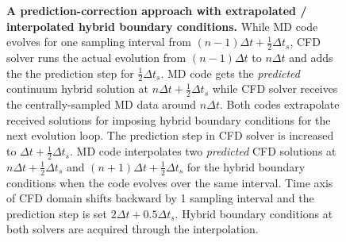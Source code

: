 \documentclass[preprint,12pt]{elsarticle}
\begin{document}
\begin{figure}
\centering
{}
\caption[]{\small {\bf A prediction-correction approach with extrapolated / interpolated hybrid boundary conditions.} 
 While MD code evolves for one sampling interval from
$(n-1){\Delta}t + \frac{1}{2}{\Delta}{t_s}$, CFD solver runs the actual evolution
from $(n-1){\Delta}t$ to $n{\Delta}t$ and adds the the prediction step
for $\frac{1}{2}{\Delta}{t_s}$. MD code gets the \textit{predicted} continuum hybrid solution
at $n{\Delta}t + \frac{1}{2}{\Delta}{t_s}$ while CFD solver receives the
centrally-sampled MD data around $n{\Delta}t$. Both codes extrapolate received solutions
for imposing hybrid boundary conditions for the next evolution loop.
 The prediction step in CFD solver is increased to
${\Delta}t + \frac{1}{2}{\Delta}{t_s}$. MD code interpolates two \textit{predicted}
CFD solutions at $n{\Delta}t + \frac{1}{2}{\Delta}{t_s}$ and
$(n+1){\Delta}t + \frac{1}{2}{\Delta}{t_s}$ for the hybrid boundary conditions
when the code evolves over the same interval.
 Time axis of CFD domain shifts backward by 1 sampling
interval and the prediction step is set $2{\Delta}t + 0.5{\Delta}{t_s}$.
Hybrid boundary conditions at both solvers are acquired through the interpolation.}
\label{Hybrid_Timescale2}
\end{figure}
\end{document}

